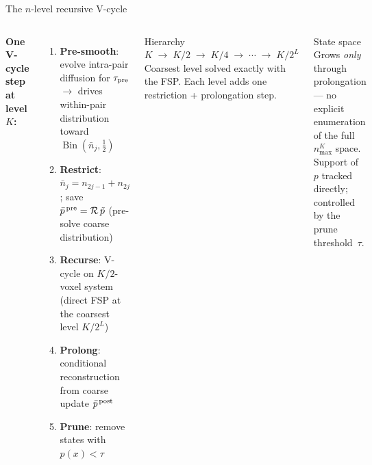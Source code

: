 \documentclass[10pt,aspectratio=169]{beamer}
\newcommand{\Bin}{\operatorname{Bin}}
\newcommand{\calR}{\mathcal{R}}
\begin{document}
\begin{frame}{The $n$-level recursive V-cycle}

\begin{columns}[T]

\textbf{One V-cycle step at level $K$:}\\[0.4em]

\begin{enumerate}\setlength\itemsep{0.28em}
  \item \textbf{Pre-smooth}: evolve intra-pair diffusion for $\tau_{\rm pre}$
        $\to$ drives within-pair distribution toward
        $\Bin(\bar n_j,\tfrac{1}{2})$

  \item \textbf{Restrict}: $\bar n_j = n_{2j-1}+n_{2j}$;
        save $\bar p^{\,\rm pre} = \calR\,\tilde p$ (pre-solve coarse distribution)

  \item \textbf{Recurse}: V-cycle on $K/2$-voxel system\\
        (direct FSP at the coarsest level $K/2^L$)

  \item \textbf{Prolong}: conditional reconstruction
        from coarse update $\bar p^{\,\rm post}$

  \item \textbf{Prune}: remove states with $p(x) < \tau$
\end{enumerate}

\vspace{0.4em}
\begin{block}{Hierarchy}
  $K \;\to\; K/2 \;\to\; K/4 \;\to\; \cdots \;\to\; K/2^L$\\[0.3em]
  Coarsest level solved exactly with the FSP.
  Each level adds one restriction + prolongation step.
\end{block}

\vspace{0.4em}
\begin{block}{State space}
  Grows \emph{only} through prolongation --- no explicit enumeration
  of the full $n_{\max}^K$ space.
  Support of $p$ tracked directly; controlled by the prune threshold~$\tau$.
\end{block}

\end{columns}

\end{frame}
\end{document}
